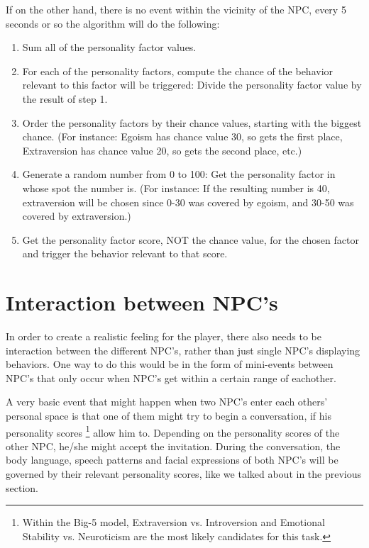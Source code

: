 \documentclass{article}
\begin{document}
    If on the other hand, there is no event within the vicinity of the NPC, every 5 seconds or so the algorithm will do the following:

    \begin{enumerate}
    	\item Sum all of the personality factor values. 
    	\item For each of the personality factors, compute the chance of the behavior relevant to this factor will be triggered: Divide the personality factor value by the result of step 1.
    	\item Order the personality factors by their chance values, starting with the biggest chance. (For instance: Egoism has chance value 30, so gets the first place, Extraversion has chance value 20, so gets the second place, etc.)
    	\item Generate a random number from 0 to 100: Get the personality factor in whose spot the number is. (For instance: If the resulting number is 40, extraversion will be chosen since 0-30 was covered by egoism, and 30-50 was covered by extraversion.)
    	\item Get the personality factor score, NOT the chance value, for the chosen factor and trigger the behavior relevant to that score.
    \end{enumerate}
 

	\newpage
	\section{Interaction between NPC's}
	In order to create a realistic feeling for the player, there also needs to be interaction between the different NPC's, rather than just single NPC's displaying behaviors. One way to do this would be in the form of mini-events between NPC's that only occur when NPC's get within a certain range of eachother. 

	A very basic event that might happen when two NPC's enter each others' personal space is that one of them might try to begin a conversation, if his personality scores \footnote{Within the Big-5 model, Extraversion vs. Introversion and Emotional Stability vs. Neuroticism are the most likely candidates for this task.} allow him to. Depending on the personality scores of the other NPC, he/she might accept the invitation. During the conversation, the body language, speech patterns and facial expressions of both NPC's will be governed by their relevant personality scores, like we talked about in the previous section.
\end{document}
